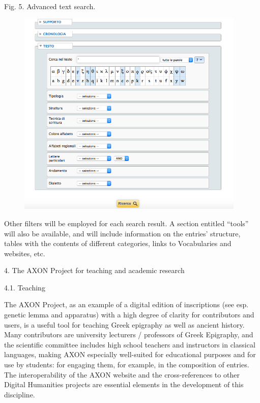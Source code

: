 \documentclass[amsthm,ebook]{saparticle}
\begin{document}
\bigskip


\bigskip


\bigskip


\bigskip


\bigskip


\bigskip

Fig. 5. Advanced text search. 


\bigskip



\begin{figure}
\centering
\includegraphics[width=10.88cm,height=9.888cm]{EAGLE2016FullPaperrevised-img005.png}
\end{figure}
Other filters will be employed for each search result. A section entitled “tools” will also be available, and will
include information on the entries’ structure, tables with the contents of different categories, links to Vocabularies
and websites, etc. 

4. The AXON Project for teaching and academic research


\bigskip

4.1. Teaching


\bigskip

The AXON Project, as an example of a digital edition of inscriptions (see esp. genetic lemma and apparatus) with a high
degree of clarity for contributors and users, is a useful tool for teaching Greek epigraphy as well as ancient history.
Many contributors are university lecturers / professors of Greek Epigraphy, and the scientific committee includes high
school teachers and instructors in classical languages, making AXON especially well-suited for educational purposes and
for use by students: for engaging them, for example, in the composition of entries. The interoperability of the AXON
website and the cross-references to other Digital Humanities projects are essential elements in the development of this
discipline. 
\end{document}
